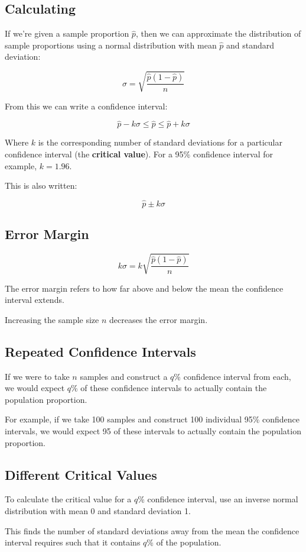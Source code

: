 \documentclass[a4paper,11pt]{article}
\begin{document}
\subsection{Calculating}

If we're given a sample proportion $\hat{p}$, then we can approximate the
distribution of sample proportions using a normal distribution with mean
$\hat{p}$ and standard deviation:

$$
\sigma = \sqrt{\frac{\hat{p}(1 - \hat{p})}{n}}
$$

From this we can write a confidence interval:

$$
\hat{p} - k\sigma \leq \hat{p} \leq \hat{p} + k\sigma
$$

Where $k$ is the corresponding number of standard deviations for a particular
confidence interval (the \textbf{critical value}). For a 95\% confidence
interval for example, $k = 1.96$.

This is also written:

$$
\hat{p} \pm k\sigma
$$

\subsection{Error Margin}

$$
k\sigma = k\sqrt{\frac{\hat{p}(1 - \hat{p})}{n}}
$$

The error margin refers to how far above and below the mean the confidence
interval extends.

Increasing the sample size $n$ decreases the error margin.

\subsection{Repeated Confidence Intervals}

If we were to take $n$ samples and construct a $q$\% confidence interval from
each, we would expect $q$\% of these confidence intervals to actually contain
the population proportion.

For example, if we take 100 samples and construct 100 individual 95\% confidence
intervals, we would expect 95 of these intervals to actually contain the
population proportion.

\subsection{Different Critical Values}

To calculate the critical value for a $q$\% confidence interval, use an inverse
normal distribution with mean 0 and standard deviation 1.

This finds the number of standard deviations away from the mean the confidence
interval requires such that it contains $q$\% of the population.
\end{document}

